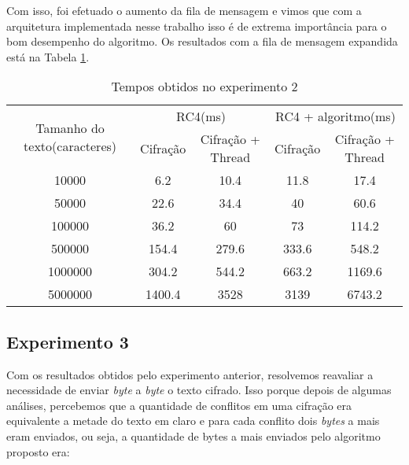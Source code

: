 Com isso, foi efetuado o aumento da fila de mensagem e vimos que com a arquitetura implementada nesse trabalho isso é de extrema importância para o bom desempenho do algoritmo. Os resultados com a fila de mensagem expandida está na Tabela \ref{results-experiment-2}.

\begin{table}[h]
\begin{tabular}{ c c c c c }
\toprule
\multirow{2}{3cm}{Tamanho do texto(caracteres)} & \multicolumn{2}{c}{RC4(ms)}     & \multicolumn{2}{c}{RC4 + algoritmo(ms)} \\ 
                                     & Cifração & Cifração + Thread & Cifração     & Cifração + Thread     \\ \hline
10000                                & 6.2      & 10.4              & 11.8         & 17.4                  \\ \hline
50000                                & 22.6     & 34.4              & 40           & 60.6                  \\ \hline
100000                               & 36.2     & 60                & 73           & 114.2                 \\ \hline
500000                               & 154.4    & 279.6             & 333.6        & 548.2                 \\ \hline
1000000                              & 304.2    & 544.2             & 663.2        & 1169.6                \\ \hline
5000000                              & 1400.4   & 3528              & 3139         & 6743.2      \\ \hline
\end{tabular}
\caption{Tempos obtidos no experimento 2}
\label{results-experiment-2}
\end{table}

\subsection{Experimento 3}

Com os resultados obtidos pelo experimento anterior, resolvemos reavaliar a necessidade de enviar \textit{byte} a \textit{byte} o texto cifrado. Isso porque depois de algumas análises, percebemos que a quantidade de conflitos em uma cifração era equivalente a metade do texto em claro e para cada conflito dois \textit{bytes} a mais eram enviados, ou seja, a quantidade de bytes a mais enviados pelo algoritmo proposto era:

